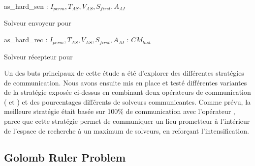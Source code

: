 \documentclass{jfpc-preprint}
\begin{document}
\begin{algorithm}
\dontprintsemicolon
\scriptsize
\SetNoline
{}
   as\_hard\_sen\;
\algoindent{} : $I_{perm}, T_{AS}, V_{AS}, S_{first}, A_{AI}$ \;
\caption{Solveur envoyeur pour \CARRP}\label{as:costas_sender}
\end{algorithm}

\begin{algorithm}
\dontprintsemicolon
\scriptsize
\SetInd{2pt}{2pt}
\SetNoline
{}
   as\_hard\_rec\;
\algoindent{} : $I_{perm}, T_{AS}, V_{AS}, S_{first}, A_{AI}$ \; 
\algoindent{}: $CM_{last}$\;
\caption{Solveur récepteur pour \CARRP}\label{as:costas-receiver}
\end{algorithm}

Un des buts principaux de cette étude a été d'explorer des différentes stratégies de communication. Nous avons ensuite mis en place et testé différentes variantes de la stratégie exposée ci-dessus en combinant deux opérateurs de communication (\oneTone{} et \oneTn) et des pourcentages différents de solveurs communicantes. Comme prévu, la meilleure stratégie était basée sur 100\% de communication avec l'opérateur \oneTn{}, parce que cette stratégie permet de communiquer un lieu prometteur à l'intérieur de l'espace de recherche à un maximum de solveurs, en refor\c{c}ant  l'intensification.

\subsection{Golomb Ruler Problem}
\end{document}
